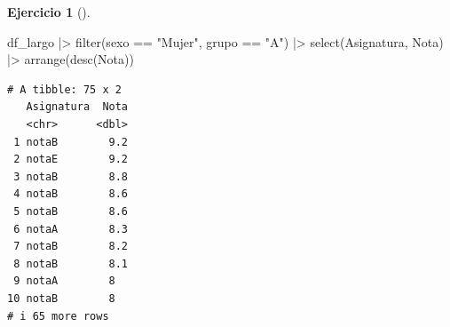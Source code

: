 \documentclass[
  a4paper,
]{scrreport}
\newenvironment{Shaded}{\begin{snugshade}}{\end{snugshade}}
\newcommand{\FunctionTok}[1]{\textcolor[rgb]{0.28,0.35,0.67}{#1}}
\newcommand{\NormalTok}[1]{\textcolor[rgb]{0.00,0.23,0.31}{#1}}
\newcommand{\SpecialCharTok}[1]{\textcolor[rgb]{0.37,0.37,0.37}{#1}}
\newcommand{\StringTok}[1]{\textcolor[rgb]{0.13,0.47,0.30}{#1}}
\theoremstyle{definition}
\newtheorem{exercise}{Ejercicio}[chapter]
\theoremstyle{remark}
\begin{document}
\begin{exercise}[]
\begin{enumerate}
  \begin{tcolorbox}[enhanced jigsaw, breakable, toptitle=1mm, colbacktitle=quarto-callout-tip-color!10!white, rightrule=.15mm, opacityback=0, opacitybacktitle=0.6, titlerule=0mm, coltitle=black, colframe=quarto-callout-tip-color-frame, colback=white, bottomtitle=1mm, leftrule=.75mm, toprule=.15mm, title=\textcolor{quarto-callout-tip-color}{\faLightbulb}\hspace{0.5em}{Solución}, arc=.35mm, bottomrule=.15mm, left=2mm]

\begin{Shaded}
\begin{Highlighting}[]
\NormalTok{df\_largo }\SpecialCharTok{|\textgreater{}}
    \FunctionTok{filter}\NormalTok{(sexo }\SpecialCharTok{==} \StringTok{"Mujer"}\NormalTok{, grupo }\SpecialCharTok{==} \StringTok{"A"}\NormalTok{) }\SpecialCharTok{|\textgreater{}}
    \FunctionTok{select}\NormalTok{(Asignatura, Nota) }\SpecialCharTok{|\textgreater{}}
    \FunctionTok{arrange}\NormalTok{(}\FunctionTok{desc}\NormalTok{(Nota))}
\end{Highlighting}
\end{Shaded}

\begin{verbatim}
# A tibble: 75 x 2
   Asignatura  Nota
   <chr>      <dbl>
 1 notaB        9.2
 2 notaE        9.2
 3 notaB        8.8
 4 notaB        8.6
 5 notaB        8.6
 6 notaA        8.3
 7 notaB        8.2
 8 notaB        8.1
 9 notaA        8  
10 notaB        8  
# i 65 more rows
\end{verbatim}

  \end{tcolorbox}
\end{enumerate}

\end{exercise}
\end{document}
